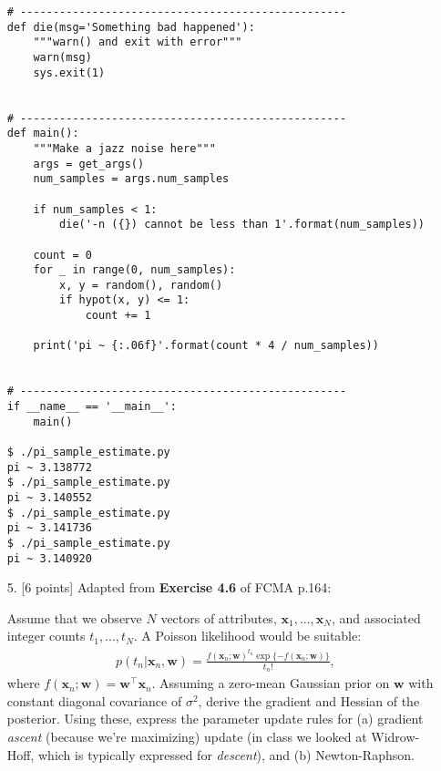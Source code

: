\documentclass[10pt]{article}
\begin{document}
\begin{itemize}
\begin{verbatim}
# --------------------------------------------------
def die(msg='Something bad happened'):
    """warn() and exit with error"""
    warn(msg)
    sys.exit(1)


# --------------------------------------------------
def main():
    """Make a jazz noise here"""
    args = get_args()
    num_samples = args.num_samples

    if num_samples < 1:
        die('-n ({}) cannot be less than 1'.format(num_samples))

    count = 0
    for _ in range(0, num_samples):
        x, y = random(), random()
        if hypot(x, y) <= 1:
            count += 1

    print('pi ~ {:.06f}'.format(count * 4 / num_samples))


# --------------------------------------------------
if __name__ == '__main__':
    main()
    
$ ./pi_sample_estimate.py
pi ~ 3.138772
$ ./pi_sample_estimate.py
pi ~ 3.140552
$ ./pi_sample_estimate.py
pi ~ 3.141736
$ ./pi_sample_estimate.py
pi ~ 3.140920
\end{verbatim}


\item[5.]  [6 points]
Adapted from {\bf Exercise 4.6} of FCMA p.164:

Assume that we observe $N$ vectors of attributes, $\mathbf{x}_1, ..., \mathbf{x}_N$, and associated integer counts $t_1, ..., t_N$.  A Poisson likelihood would be suitable:
\begin{eqnarray*}
p(t_n | \mathbf{x}_n, \mathbf{w}) = \frac{f(\mathbf{x}_n; \mathbf{w})^{t_n} \exp \{ -f(\mathbf{x}_n; \mathbf{w}) \}}{t_n!},
\end{eqnarray*}
where $f(\mathbf{x}_n;\mathbf{w}) = \mathbf{w}^\top\mathbf{x}_n$.
Assuming a zero-mean Gaussian prior on $\mathbf{w}$ with constant diagonal covariance of $\sigma^2$, derive the gradient and Hessian of the posterior.  Using these, express the parameter update rules for (a) gradient {\em ascent} (because we're maximizing) update (in class we looked at Widrow-Hoff, which is typically expressed for {\em descent}), and (b) Newton-Raphson.


\end{itemize}
\end{document}
